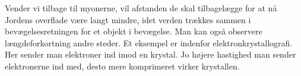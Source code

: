 Vender vi tilbage til myonerne, vil afstanden de skal tilbagelægge for at nå Jordens overflade være langt mindre, idet verden trækkes sammen i bevægelsesretningen for et objekt i bevægelse.
Man kan også observere længdeforkortning andre steder. Et eksempel er indenfor elektronkrystallografi. Her sender man elektroner ind imod en krystal. Jo højere hastighed man sender elektronerne ind med, desto mere komprimeret virker krystallen.